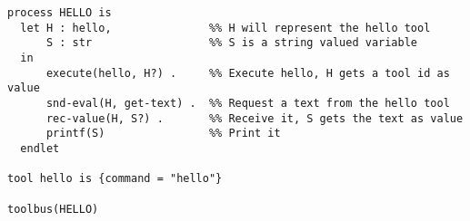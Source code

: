 \small
\begin{verbatim}
process HELLO is
  let H : hello,               %% H will represent the hello tool
      S : str                  %% S is a string valued variable
  in
      execute(hello, H?) .     %% Execute hello, H gets a tool id as value
      snd-eval(H, get-text) .  %% Request a text from the hello tool
      rec-value(H, S?) .       %% Receive it, S gets the text as value
      printf(S)                %% Print it    
  endlet

tool hello is {command = "hello"}

toolbus(HELLO)
\end{verbatim}
\normalsize
